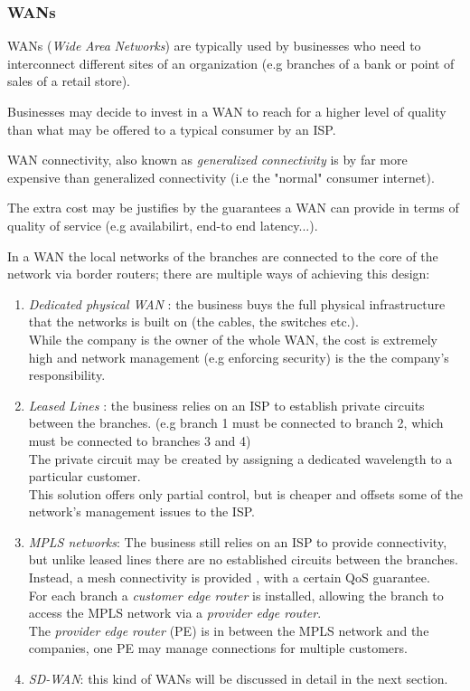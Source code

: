 \documentclass{article}
\begin{document}
  \subsubsection{WANs}
  WANs (\textit{Wide} \textit{Area} \textit{Networks}) are typically used by businesses who need to interconnect different sites of an organization (e.g branches of a bank or point of sales of a retail store).

  Businesses may decide to invest in a WAN to reach for a higher level of quality than what may be offered to a typical consumer by an ISP.
   
  WAN connectivity, also known as \textit{generalized connectivity} is by far more expensive than generalized connectivity (i.e the "normal" consumer internet).
  
   The extra cost may be justifies by the guarantees a WAN can provide in terms of quality of service (e.g availabilirt, end-to end latency...).
   
   In a WAN the local networks of the branches are connected to the core of the network via border routers; there are multiple ways of achieving this design:
   
   \begin{enumerate}
   	\item \textit{Dedicated physical WAN} : the business buys the full physical infrastructure that the networks is built on (the cables, the switches etc.). \\ While the company is the owner of the whole WAN, the cost is extremely high and network management (e.g enforcing security) is the the company's responsibility.
   	
   	\item \textit{Leased Lines} : the business relies on an ISP to establish private circuits between the branches. (e.g branch 1 must be connected to branch 2, which must be connected to branches 3 and 4) \\
   	The private circuit may be created by assigning  a dedicated wavelength to a particular customer. \\
   	This solution offers only partial control, but is cheaper and offsets some of the network's management issues to the ISP.
   	
   	\item \textit{MPLS networks}: The business still relies on an ISP to provide connectivity, but unlike leased lines there are no established circuits between the branches.  Instead, a mesh connectivity is provided , with a certain QoS guarantee. \\
   	For each branch a \textit{customer edge router} is installed, allowing the branch to access the MPLS network via a \textit{provider edge router}. \\
   	The \textit{provider edge router} (PE) is in between the MPLS network and the companies, one PE may manage connections for multiple customers.
   	
   	\item \textit{SD-WAN}: this kind of WANs will be discussed in detail in the next section.
   	
   \end{enumerate} 
\end{document}
